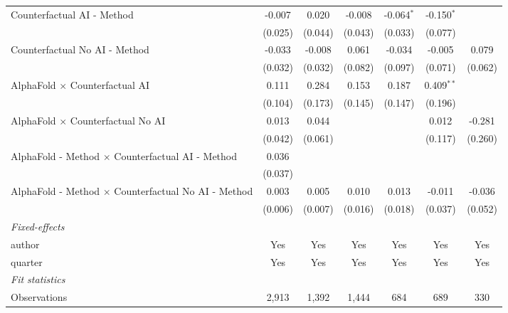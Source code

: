 \begin{tabular}{lcccccc}
   Counterfactual AI - Method                                 & -0.007  & 0.020   & -0.008  & -0.064$^{*}$ & -0.150$^{*}$ &   \\   
                                                              & (0.025) & (0.044) & (0.043) & (0.033)      & (0.077)      &   \\   
   Counterfactual No AI - Method                              & -0.033  & -0.008  & 0.061   & -0.034       & -0.005       & 0.079\\   
                                                              & (0.032) & (0.032) & (0.082) & (0.097)      & (0.071)      & (0.062)\\   
   AlphaFold $\times$ Counterfactual AI                       & 0.111   & 0.284   & 0.153   & 0.187        & 0.409$^{**}$ &   \\   
                                                              & (0.104) & (0.173) & (0.145) & (0.147)      & (0.196)      &   \\   
   AlphaFold $\times$ Counterfactual No AI                    & 0.013   & 0.044   &         &              & 0.012        & -0.281\\   
                                                              & (0.042) & (0.061) &         &              & (0.117)      & (0.260)\\   
   AlphaFold - Method $\times$ Counterfactual AI - Method     & 0.036   &         &         &              &              &   \\   
                                                              & (0.037) &         &         &              &              &   \\   
   AlphaFold - Method $\times$ Counterfactual No AI - Method  & 0.003   & 0.005   & 0.010   & 0.013        & -0.011       & -0.036\\   
                                                              & (0.006) & (0.007) & (0.016) & (0.018)      & (0.037)      & (0.052)\\   
   \midrule
   \emph{Fixed-effects}\\
   author                                                     & Yes     & Yes     & Yes     & Yes          & Yes          & Yes\\  
   quarter                                                    & Yes     & Yes     & Yes     & Yes          & Yes          & Yes\\  
   \midrule
   \emph{Fit statistics}\\
   Observations                                               & 2,913   & 1,392   & 1,444   & 684          & 689          & 330\\  

\end{tabular}
